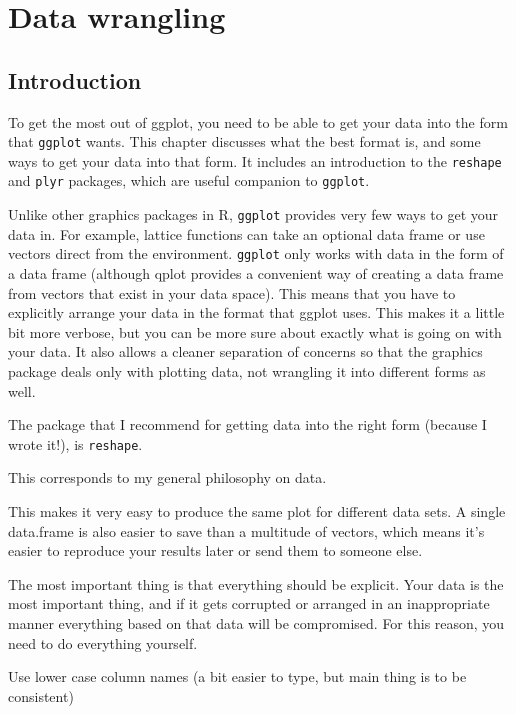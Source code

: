 
\label{cha:data}

\chapter{Data wrangling}

\section{Introduction}

To get the most out of ggplot, you need to be able to get your data into the form that {\tt ggplot} wants.  This chapter discusses what the best format is, and some ways to get your data into that form.  It includes an introduction to the {\tt reshape} and {\tt plyr} packages, which are useful companion to {\tt ggplot}.  

Unlike other graphics packages in R, {\tt ggplot} provides very few ways to get your data in.  For example, lattice functions can take an optional data frame or use vectors direct from the environment.  {\tt ggplot} only works with data in the form of a data frame (although qplot provides a convenient way of creating a data frame from vectors that exist in your data space).  This means that you have to explicitly arrange your data in the format that ggplot uses.  This makes it a little bit more verbose, but you can be more sure about exactly what is going on with your data.  It also allows a cleaner separation of concerns so that the graphics package deals only with plotting data, not wrangling it into different forms as well.

The package that I recommend for getting data into the right form (because I wrote it!), is {\tt reshape}.

This corresponds to my general philosophy on data.  

This makes it very easy to produce the same plot for different data sets.  A single data.frame is also easier to save than a multitude of vectors, which means it's easier to reproduce your results later or send them to someone else.  

The most important thing is that everything should be explicit.  Your data is the most important thing, and if it gets corrupted or arranged in an inappropriate manner everything based on that data will be compromised.  For this reason, you need to do everything yourself.

Use lower case column names (a bit easier to type, but main thing is to be consistent)

